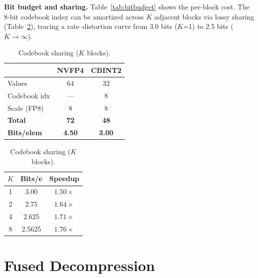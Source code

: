 \documentclass[11pt,a4paper]{article}
\begin{document}
\textbf{Bit budget and sharing.}
Table~\ref{tab:bitbudget} shows the per-block cost.
The 8-bit codebook index can be amortized across $K$ adjacent blocks via lossy sharing (Table~\ref{tab:sharing}), tracing a rate--distortion curve from 3.0 bits ($K$=1) to 2.5 bits ($K\to\infty$).

\begin{table}[t]
\centering
\begin{minipage}[t]{0.48\textwidth}
\centering
\caption{Per-block bit budget.}
\label{tab:bitbudget}
\begin{tabular}{lcc}
\toprule
 & \textbf{NVFP4} & \textbf{CBINT2} \\
\midrule
Values & 64 & 32 \\
Codebook idx & --- & 8 \\
Scale (FP8) & 8 & 8 \\
\midrule
\textbf{Total} & \textbf{72} & \textbf{48} \\
\textbf{Bits/elem} & \textbf{4.50} & \textbf{3.00} \\
\bottomrule
\end{tabular}
\end{minipage}\hfill
\begin{minipage}[t]{0.48\textwidth}
\centering
\caption{Codebook sharing ($K$ blocks).}
\label{tab:sharing}
\begin{tabular}{ccc}
\toprule
$K$ & \textbf{Bits/e} & \textbf{Speedup} \\
\midrule
1 & 3.00 & $1.50\times$ \\
2 & 2.75 & $1.64\times$ \\
4 & 2.625 & $1.71\times$ \\
8 & 2.5625 & $1.76\times$ \\
\bottomrule
\end{tabular}
\end{minipage}
\end{table}

\section{Fused Decompression}
\label{sec:kernel}
\end{document}
